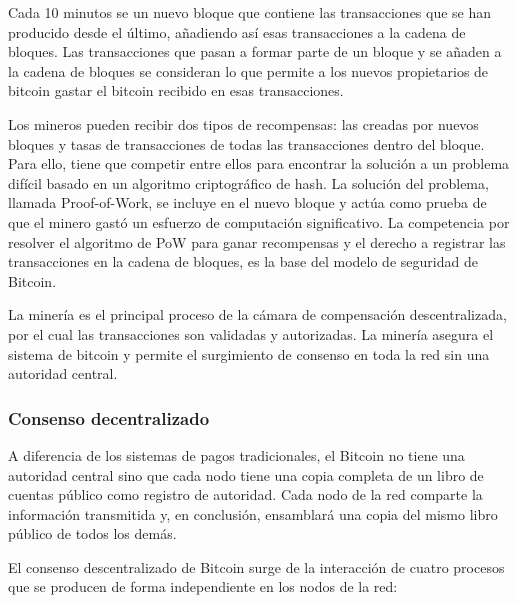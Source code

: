 \vspace{5mm}

\noindent Cada 10 minutos se  un nuevo bloque que contiene las transacciones que se han producido desde el 
último, añadiendo así esas transacciones a la cadena de bloques. Las transacciones que pasan a formar parte de un bloque 
y se añaden a la cadena de bloques se consideran  lo que permite a los nuevos propietarios de bitcoin 
gastar el bitcoin recibido en esas transacciones.

\vspace{5mm}

\noindent Los mineros pueden recibir dos tipos de recompensas: las creadas por nuevos bloques y tasas de transacciones 
de todas las transacciones dentro del bloque. Para ello, tiene que competir entre ellos para encontrar la solución a 
un problema difícil basado en un algoritmo criptográfico de hash. La solución del problema, llamada Proof-of-Work, 
se incluye en el nuevo bloque y actúa como prueba de que el minero gastó un esfuerzo de computación significativo. 
La competencia por resolver el algoritmo de PoW para ganar recompensas y el derecho a registrar las transacciones 
en la cadena de bloques, es la base del modelo de seguridad de Bitcoin.

\vspace{5mm}

\noindent La minería es el principal proceso de la cámara de compensación descentralizada, por el cual las transacciones 
son validadas y autorizadas. La minería asegura el sistema de bitcoin y permite el surgimiento de consenso en toda la 
red sin una autoridad central.

\subsubsection*{Consenso decentralizado}

A diferencia de los sistemas de pagos tradicionales, el Bitcoin no tiene una autoridad central sino que cada nodo tiene
una copia completa de un libro de cuentas público como registro de autoridad. Cada nodo de la red comparte la 
información transmitida y, en conclusión, ensamblará una copia del mismo libro público de todos los demás.

\vspace{5mm}

\noindent El consenso descentralizado de Bitcoin surge de la interacción de cuatro procesos que se producen de forma 
independiente en los nodos de la red:

